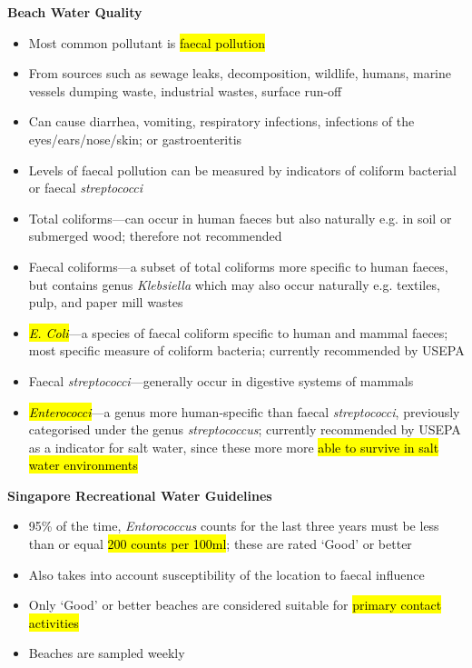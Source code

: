 \documentclass{article}
\newcommand{\headingsmall}[1]{{\small\textbf{#1}}}
\begin{document}
\begin{multicols*}{4}
\headingsmall{Beach Water Quality}
\begin{itemize} \itemsep -0.5em
    \item Most common pollutant is \hl{faecal pollution}
    \item From sources such as sewage leaks, decomposition, wildlife, humans, 
        marine vessels dumping waste, industrial wastes, surface run-off
    \item Can cause diarrhea, vomiting, respiratory infections, infections of
        the eyes/ears/nose/skin; or gastroenteritis
    \item Levels of faecal pollution can be measured by indicators of 
        coliform bacterial or faecal \textit{streptococci}
    \item Total coliforms---can occur in human faeces but also naturally e.g. 
        in soil or submerged wood; therefore not recommended
    \item Faecal coliforms---a subset of total coliforms more specific to
        human faeces, but contains genus \textit{Klebsiella} which may also
        occur naturally e.g. textiles, pulp, and paper mill wastes
    \item \hl{\textit{E. Coli}}---a species of faecal coliform specific to human
        and mammal faeces; most specific measure of coliform bacteria; currently
        recommended by USEPA
    \item Faecal \textit{streptococci}---generally occur in digestive systems
        of mammals
    \item \hl{\textit{Enterococci}}---a genus more human-specific than faecal
        \textit{streptococci}, previously categorised under the 
        genus \textit{streptococcus}; currently recommended by USEPA as a
        indicator for salt water, since these more more \hl{able to survive in
        salt water environments}
\end{itemize}

\headingsmall{Singapore Recreational Water Guidelines}
\begin{itemize} \itemsep -0.5em
    \item 95\% of the time, \textit{Entorococcus} counts for the last three years
        must be less than or equal \hl{200 counts per 100ml}; these are rated 
        `Good' or better
    \item Also takes into account susceptibility of the location to faecal influence
    \item Only `Good' or better beaches are considered suitable for \hl{primary 
        contact activities}
    \item Beaches are sampled weekly
\end{itemize}


\end{multicols*}
\end{document}
